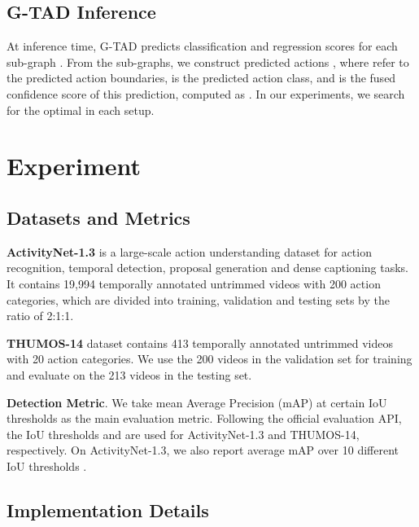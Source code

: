 \documentclass[10pt,twocolumn,letterpaper]{article}
\begin{document}
\subsection{G-TAD Inference}
At inference time, G-TAD predicts classification and regression scores for each sub-graph . From the  sub-graphs, we construct predicted actions , where  refer to the predicted action boundaries,  is the predicted action class, and  is the fused confidence score of this prediction, computed as . In our experiments, we search for the optimal  in each setup. 












%
 \section{Experiment}
\providecommand{\e}[1]{\ensuremath{\times 10^{#1}}}
\subsection{Datasets and Metrics}



\noindent
{\bf ActivityNet-1.3} \cite{caba2015activitynet}  is a large-scale action understanding dataset for action recognition, temporal detection, proposal generation and dense captioning tasks. It contains 19,994 temporally annotated untrimmed videos with 200 action categories, which are divided into training, validation and testing sets by the ratio of 2:1:1. 

\noindent
{\bf THUMOS-14} \cite{jiang2014thumos} dataset contains 413 temporally annotated untrimmed videos with 20 action categories. We use the 200 videos in the validation set for training and evaluate on the 213 videos in the testing set. 

\noindent
{\bf Detection Metric}. We take mean Average Precision (mAP) at certain IoU thresholds as the main evaluation metric. 
Following the official evaluation API, the IoU thresholds  and  are used for ActivityNet-1.3 and THUMOS-14, respectively. On ActivityNet-1.3,  we also report average mAP over 10 different IoU thresholds .


\subsection{Implementation Details} \label{subsec: Details}
\end{document}
